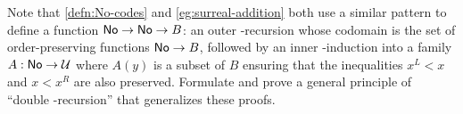 \begin{ex}\label{ex:double-No-recursion}
  Note that \cref{defn:No-codes} and \cref{eg:surreal-addition} both use a similar pattern to define a function $\mathsf{No} \to \mathsf{No} \to B$: an outer \NO-recursion whose codomain is the set of order-preserving functions $\mathsf{No}\to B$, followed by an inner \NO-induction into a family $A:\mathsf{No}\to\mathcal{U}$ where $A(y)$ is a subset of $B$ ensuring that the inequalities $x^L<x$ and $x<x^R$ are also preserved.
  Formulate and prove a general principle of ``double \NO-recursion'' that generalizes these proofs.
\end{ex}

%

